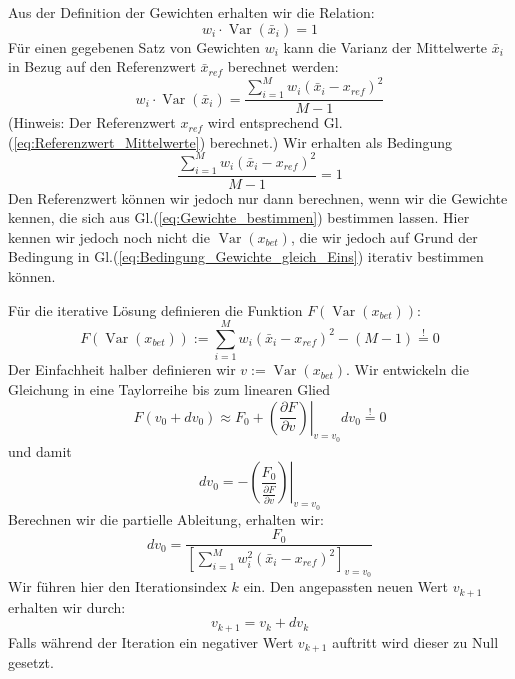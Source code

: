 Aus der Definition der Gewichten erhalten wir die Relation: 
\begin{equation}
	w_i \cdot \operatorname{Var}(\bar x_i) = 1 
\end{equation}
Für einen gegebenen Satz von Gewichten $w_i$ kann die Varianz der 
Mittelwerte $\bar x_i$ in Bezug auf den Referenzwert $\bar x_{ref}$ berechnet werden:
\begin{equation}
w_i \cdot \operatorname{Var}(\bar x_i) = \frac{\sum\limits_{i=1}^M w_i 
	(\bar x_i - x_{ref})^2}{M-1}
\end{equation}
(Hinweis: Der Referenzwert $x_{ref}$ wird entsprechend Gl.(\ref{eq:Referenzwert_Mittelwerte}) berechnet.) 
Wir erhalten als Bedingung
\begin{equation}
\frac{\sum\limits_{i=1}^M w_i 
	(\bar x_i - x_{ref})^2}{M-1} = 1
\label{eq:Bedingung_Gewichte_gleich_Eins}
\end{equation}
Den Referenzwert können wir jedoch nur dann berechnen, wenn wir die 
Gewichte kennen, die sich aus Gl.(\ref{eq:Gewichte_bestimmen}) bestimmen
lassen. Hier kennen wir jedoch noch nicht die $\operatorname{Var}(x_{bet})$,
die wir jedoch auf Grund der Bedingung in Gl.(\ref{eq:Bedingung_Gewichte_gleich_Eins}) iterativ bestimmen können.

Für die iterative Lösung definieren die Funktion $F(\operatorname{Var}(x_{bet}))$: 
\begin{equation}
F(\operatorname{Var}(x_{bet})) := \sum\limits_{i=1}^M w_i 
(\bar x_i - x_{ref})^2 - (M-1) \stackrel{!}{=} 0
\label{eq:x_bet_Bedingung}
\end{equation}
Der Einfachheit halber definieren wir 
$v:= \operatorname{Var}(x_{bet})$. Wir entwickeln die Gleichung in 
eine Taylorreihe bis zum linearen Glied
\begin{equation}
F(v_0 + d v_0) \approx F_0 + \left.\left( \frac{\partial F}{\partial v}\right)\right| _{v=v_0} dv_0 
 \stackrel{!}{=} 0
\end{equation}
und damit
\begin{equation}
dv_0 = -\left . \left( \frac{F_0}{\frac{\partial F}{\partial v}}\right)\right| _{v=v_0} 
\end{equation}
Berechnen wir die partielle Ableitung, erhalten wir:
\begin{equation}
dv_0 = \frac{F_0}{\left[\sum\limits_{i=1}^M w_i^2 
	(\bar x_i - x_{ref})^2\right]_{v=v_0}}
\end{equation}
Wir führen hier den Iterationsindex $k$ ein. 
Den angepassten neuen Wert $v_{k+1}$ erhalten wir durch:
\begin{equation}
v_{k+1} = v_k + dv_k
\end{equation}
Falls während der Iteration ein negativer Wert $v_{k+1}$ auftritt wird dieser
zu Null gesetzt.

